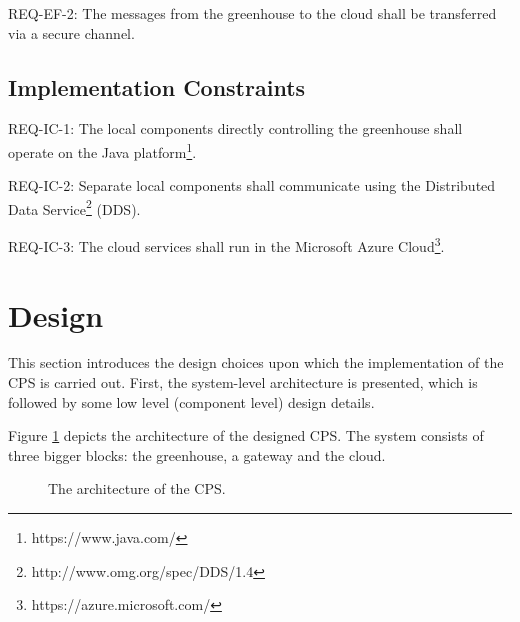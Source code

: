 \documentclass[a4paper, 11pt]{article}
\begin{document}
	REQ-EF-2: The messages from the greenhouse to the cloud shall be transferred via a secure channel.
	
	\subsection{Implementation Constraints}
	REQ-IC-1: The local components directly controlling the greenhouse shall operate on the Java platform\footnote{https://www.java.com/}.
	
	REQ-IC-2: Separate local components shall communicate using the Distributed Data Service\footnote{http://www.omg.org/spec/DDS/1.4} (DDS).
	
	REQ-IC-3: The cloud services shall run in the Microsoft Azure Cloud\footnote{https://azure.microsoft.com/}.
	
	\section{Design}
	\label{sec:design}
	This section introduces the design	choices upon which the implementation of the CPS is carried out. First, the system-level architecture is presented, which is followed by some low level (component level) design details.
	
	Figure \ref{fig:architecture} depicts the architecture of the designed CPS. The system consists of three bigger blocks: the greenhouse, a gateway and the cloud. 
		
		\begin{figure}[h!]
			\center
			\caption{The architecture of the CPS.}
			\label{fig:architecture}
		\end{figure}
\end{document}
